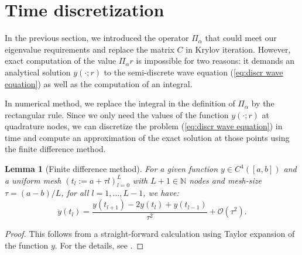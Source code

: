 \documentclass[a4paper,11pt,bibliography=totoc,listof=totoc,headinclude=true,cleardoublepage=empty,oneside]{scrbook}
\newtheorem{lemma}[theorem]{Lemma}
\newcommand{\N}{\mathbb{N}}
\newcommand{\bigO}{\mathcal{O}}
\renewcommand{\eqref}[1]{(\ref{#1})}
\begin{document}
\section{Time discretization}
In the previous section, we introduced the operator $\Pi_\alpha$ that could meet our eigenvalue requirements and replace the matrix $C$ in Krylov iteration. However, exact computation of the value $\Pi_\alpha r$ is impossible for two reasons: it demands an analytical solution $y(\cdot; r)$ to the semi-discrete wave equation \eqref{eq:discr wave equation} as well as the computation of an integral.

In numerical method, we replace the integral in the definition of $\Pi_\alpha$ by the rectangular rule. Since we only need the values of the function $y(\cdot; r)$ at quadrature nodes, we can discretize the problem \eqref{eq:discr wave equation} in time and compute an approximation of the exact solution at those points using the finite difference method.
\begin{lemma}[Finite difference method]\label{lemma:finite diffs}
    For a given function $y \in C^4 ([a, b])$ and a uniform mesh $(t_l := a+\tau l)_{l=0}^{L}$ with $L+1\in\N$ nodes and mesh-size $\tau = (a-b)/L$, for all $l=1, \dots, L-1$, we have:
    \begin{equation*}
        \ddot{y}(t_l) = \frac{y(t_{l+1}) - 2 y(t_l) + y(t_{l-1})}{\tau^2} + \bigO(\tau^2).
    \end{equation*}
\end{lemma}
\begin{proof}
    This follows from a straight-forward calculation using Taylor expansion of the function $y$. For the details, see \cite[p. 93]{numodes}.
\end{proof}
\end{document}
